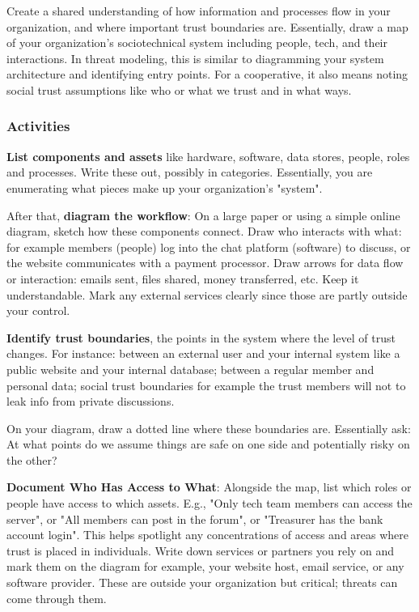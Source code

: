 Create a shared understanding of how information and processes flow in your
organization, and where important trust boundaries are. Essentially, draw a map of your
organization's sociotechnical system including people, tech, and their
interactions. In threat modeling, this is similar to diagramming your system
architecture and identifying entry points. For a cooperative, it also means
noting social trust assumptions like who or what we trust and in what ways.

\subsubsection{Activities}

\textbf{List components and assets} like hardware, software, data stores,
people, roles and processes. Write these out, possibly in categories.
Essentially, you are enumerating what pieces make up your organization's "system".

After that, \textbf{diagram the workflow}: On a large paper or using a simple online diagram,
sketch how these components connect. Draw who interacts with what:
for example members (people) log into the chat platform (software) to discuss,
or the website communicates with a payment processor. Draw arrows for data flow
or interaction: emails sent, files shared, money transferred, etc. Keep it
understandable. Mark any external services clearly since those are partly
outside your control.

\textbf{Identify trust boundaries}, the points in the system where the
level of trust changes. For instance: between an external user and your
internal system like a public website and your internal database; between
a regular member and personal data; social trust boundaries for example
the trust members will not to leak info from private discussions.

On your diagram, draw a dotted line where these boundaries are.
Essentially ask: At what points do we assume things are safe on one side
and potentially risky on the other?

\textbf{Document Who Has Access to What}: Alongside the map, list which roles or people have
access to which assets. E.g., "Only tech team members can access the server", or "All
members can post in the forum", or "Treasurer has the bank account login". This
helps spotlight any concentrations of access and areas where trust is placed in
individuals. Write down services or partners you rely on and mark them on the
diagram for example, your website host, email service, or any software
provider. These are outside your organization but critical; threats can come through them.

